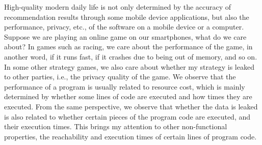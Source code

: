 High-quality modern daily life
is not only
determined by the accuracy of
recommendation results through some mobile device applications,
but also
the performance, 
privacy, etc., of the software on a mobile device or a computer. 
Suppose we are playing an online game on our smartphones, what do we care about? 
In games such as racing, 
we care about the performance of the game, in another word, if it runs fast, if it crashes due to being out of memory, and so on.
In some other strategy games, we also care about whether my strategy is leaked to
other parties, i.e., the privacy quality of the game.
We observe that the performance of
a program is usually related to resource cost, which is
mainly determined by
whether some lines of code are executed and how times they
are executed.
From the same perspective, we observe that whether the data is leaked is also related to
whether certain pieces of the program code are executed,
and their execution times.
This brings my attention to other non-functional properties,
the
reachability and 
execution times of certain lines of program code.
